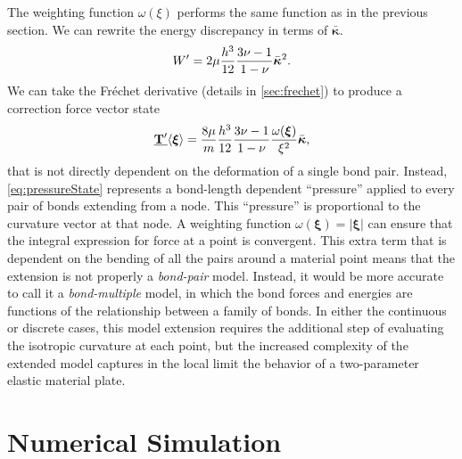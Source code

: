 %
The weighting function \(\omega(\xi)\) performs the same function as in the previous section.
We can rewrite the energy discrepancy in terms of \(\bar{\boldsymbol{\kappa}}\).
%
\begin{equation}
    W'=2\mu\frac{h^3}{12}\frac{3\nu-1}{1-\nu}\bar{\boldsymbol{\kappa}}^2. \notag
\end{equation}
%
We can take the Fr\'{e}chet derivative (details in \ref{sec:frechet}) to produce a correction force vector state
%
\begin{equation}
    \vstate{T'}{}{\boldsymbol{\xi}}=\frac{8\mu}{m}\frac{h^3}{12}\frac{3\nu-1}{1-\nu}\frac{\omega(\boldsymbol{\xi})}{\xi^2} \bar{\boldsymbol{\kappa}},
    \label{eq:pressureState}
\end{equation}
%
that is not directly dependent on the deformation of a single bond pair.  Instead, \cref{eq:pressureState} represents a bond-length dependent ``pressure'' applied to every pair of bonds extending from a node.  This ``pressure'' is proportional to the curvature vector at that node.
A weighting function \(\omega(\boldsymbol{\xi}) = |\boldsymbol{\xi}|\) can ensure that the integral expression for force at a point is convergent.  This extra term that is dependent on the bending of all the pairs around a material point means that the extension is not properly a \textit{bond-pair} model.  Instead, it would be more accurate to call it a \textit{bond-multiple} model, in which the bond forces and energies are functions of the relationship between a family of bonds.  In either the continuous or discrete cases, this model extension requires the additional step of evaluating the isotropic curvature at each point, but the increased complexity of the extended model captures in the local limit the behavior of a two-parameter elastic material plate.
%
\chapter{Numerical Simulation}
